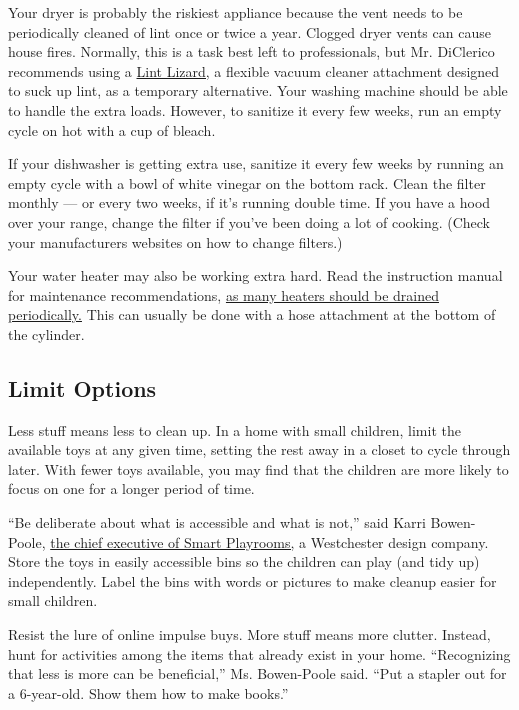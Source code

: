 Your dryer is probably the riskiest appliance because the vent needs to
be periodically cleaned of lint once or twice a year. Clogged dryer
vents can cause house fires. Normally, this is a task best left to
professionals, but Mr. DiClerico recommends using a
\href{https://www.consumerreports.org/cro/magazine/2013/01/claim-check-lint-lizard/index.htm}{Lint
Lizard,} a flexible vacuum cleaner attachment designed to suck up lint,
as a temporary alternative. Your washing machine should be able to
handle the extra loads. However, to sanitize it every few weeks, run an
empty cycle on hot with a cup of bleach.

If your dishwasher is getting extra use, sanitize it every few weeks by
running an empty cycle with a bowl of white vinegar on the bottom rack.
Clean the filter monthly --- or every two weeks, if it's running double
time. If you have a hood over your range, change the filter if you've
been doing a lot of cooking. (Check your manufacturers websites on how
to change filters.)

Your water heater may also be working extra hard. Read the instruction
manual for maintenance recommendations,
\href{https://www.diynetwork.com/how-to/skills-and-know-how/plumbing/how-to-drain-a-water-heater}{as
many heaters should be drained periodically.} This can usually be done
with a hose attachment at the bottom of the cylinder.

\hypertarget{limit-options}{%
\subsection{Limit Options}\label{limit-options}}

Less stuff means less to clean up. In a home with small children, limit
the available toys at any given time, setting the rest away in a closet
to cycle through later. With fewer toys available, you may find that the
children are more likely to focus on one for a longer period of time.

``Be deliberate about what is accessible and what is not,'' said Karri
Bowen-Poole, \href{https://www.smartplayrooms.com/}{the chief executive
of Smart Playrooms,} a Westchester design company. Store the toys in
easily accessible bins so the children can play (and tidy up)
independently. Label the bins with words or pictures to make cleanup
easier for small children.

Resist the lure of online impulse buys. More stuff means more clutter.
Instead, hunt for activities among the items that already exist in your
home. ``Recognizing that less is more can be beneficial,'' Ms.
Bowen-Poole said. ``Put a stapler out for a 6-year-old. Show them how to
make books.''

